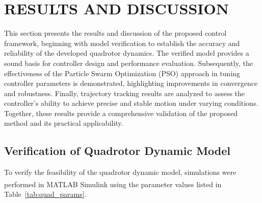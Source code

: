 \chapter{ RESULTS AND DISCUSSION}


This section presents the results and discussion of the proposed control framework, beginning with model verification to establish the accuracy and reliability of the developed quadrotor dynamics. The verified model provides a sound basis for controller design and performance evaluation. Subsequently, the effectiveness of the Particle Swarm Optimization (PSO) approach in tuning controller parameters is demonstrated, highlighting improvements in convergence and robustness. Finally, trajectory tracking results are analyzed to assess the controller’s ability to achieve precise and stable motion under varying conditions. Together, these results provide a comprehensive validation of the proposed method and its practical applicability.

\section{Verification of Quadrotor Dynamic Model}


To verify the feasibility of the quadrotor dynamic model, simulations were performed in 
MATLAB\textsuperscript{\textregistered} Simulink using the parameter values listed in Table~\ref{tab:quad_params}.


